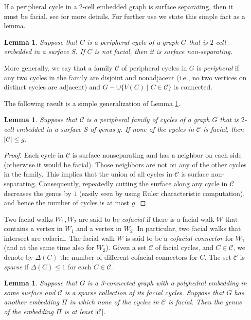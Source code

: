 \documentclass[11pt]{article}
\newtheorem{lemma}[theorem]{Lemma}
\newcommand\C{\mathcal C}
\begin{document}
If a peripheral cycle in a 2-cell embedded graph is surface separating, then it must be facial, see \cite{MT01} for more details. For further use we state this simple fact as a lemma.

\begin{lemma}\label{lem:peripheral cycle}
  Suppose that $C$ is a peripheral cycle of a graph $G$ that is $2$-cell embedded in a surface $S$. If $C$ is not facial, then it is surface non-separating.
\end{lemma}

More generally, we say that a family $\C$ of peripheral cycles in $G$ is \emph{peripheral} if any two cycles in the family are disjoint and nonadjacent (i.e., no two vertices on distinct cycles are adjacent) and $G-\cup\{V(C)\mid C\in\C\}$ is connected.

The following result is a simple generalization of Lemma \ref{lem:peripheral cycle}.

\begin{lemma}\label{lem:peripheral family}
  Suppose that $\C$ is a peripheral family of cycles of a graph $G$ that is $2$-cell embedded in a surface $S$ of genus $g$. If none of the cycles in $\C$ is facial, then $|\C|\le g$.
\end{lemma}

\begin{proof}
  Each cycle in $\C$ is surface nonseparating and has a neighbor on each side (otherwise it would be facial). Those neighbors are not on any of the other cycles in the family. This implies that the union of all cycles in $\C$ is surface non-separating. Consequently, repeatedly cutting the surface along any cycle in $\C$ decreases the genus by $1$ (easily seen by using Euler characteristic computation), and hence the number of cycles is at most $g$.
\end{proof}

Two facial walks $W_1,W_2$ are said to be \emph{cofacial} if there is a facial walk $W$ that contains a vertex in $W_1$ and a vertex in $W_2$. In particular, two facial walks that intersect are cofacial. The facial walk $W$ is said to be a \emph{cofacial connector} for $W_1$ (and at the same time also for $W_2$). Given a set $\C$ of facial cycles, and $C\in \C$, we denote by $\Delta(C)$ the number of different cofacial connectors for $C$. The set $\C$ is \emph{sparse} if $\Delta(C)\le1$ for each $C\in\C$.

\begin{lemma}\label{lem:non cofacial faces}
   Suppose that $G$ is a 3-connected graph with a polyhedral embedding in some surface and $\C$ is a sparse collection of its facial cycles. Suppose that $G$ has another embedding $\Pi$ in which none of the cycles in $\C$ is facial. Then the genus of the embedding $\Pi$ is at least $|\C|$.
\end{lemma}
\end{document}
